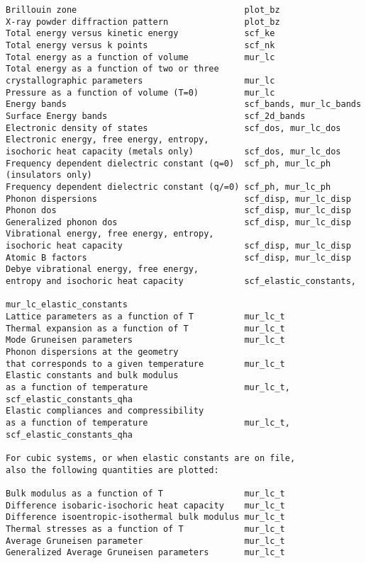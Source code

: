 \documentclass[12pt,a4paper]{article}
\begin{document}
\begin{verbatim}
Brillouin zone                                 plot_bz
X-ray powder diffraction pattern               plot_bz
Total energy versus kinetic energy             scf_ke
Total energy versus k points                   scf_nk
Total energy as a function of volume           mur_lc
Total energy as a function of two or three
crystallographic parameters                    mur_lc
Pressure as a function of volume (T=0)         mur_lc
Energy bands                                   scf_bands, mur_lc_bands
Surface Energy bands                           scf_2d_bands
Electronic density of states                   scf_dos, mur_lc_dos
Electronic energy, free energy, entropy,      
isochoric heat capacity (metals only)          scf_dos, mur_lc_dos
Frequency dependent dielectric constant (q=0)  scf_ph, mur_lc_ph
(insulators only)
Frequency dependent dielectric constant (q/=0) scf_ph, mur_lc_ph
Phonon dispersions                             scf_disp, mur_lc_disp
Phonon dos                                     scf_disp, mur_lc_disp
Generalized phonon dos                         scf_disp, mur_lc_disp
Vibrational energy, free energy, entropy,      
isochoric heat capacity                        scf_disp, mur_lc_disp
Atomic B factors                               scf_disp, mur_lc_disp
Debye vibrational energy, free energy, 
entropy and isochoric heat capacity            scf_elastic_constants, 
                                               mur_lc_elastic_constants
Lattice parameters as a function of T          mur_lc_t
Thermal expansion as a function of T           mur_lc_t 
Mode Gruneisen parameters                      mur_lc_t
Phonon dispersions at the geometry 
that corresponds to a given temperature        mur_lc_t
Elastic constants and bulk modulus
as a function of temperature                   mur_lc_t, scf_elastic_constants_qha
Elastic compliances and compressibility
as a function of temperature                   mur_lc_t, scf_elastic_constants_qha

For cubic systems, or when elastic constants are on file,
also the following quantities are plotted:

Bulk modulus as a function of T                mur_lc_t
Difference isobaric-isochoric heat capacity    mur_lc_t
Difference isoentropic-isothermal bulk modulus mur_lc_t
Thermal stresses as a function of T            mur_lc_t
Average Gruneisen parameter                    mur_lc_t
Generalized Average Gruneisen parameters       mur_lc_t     

\end{verbatim}
\end{document}
